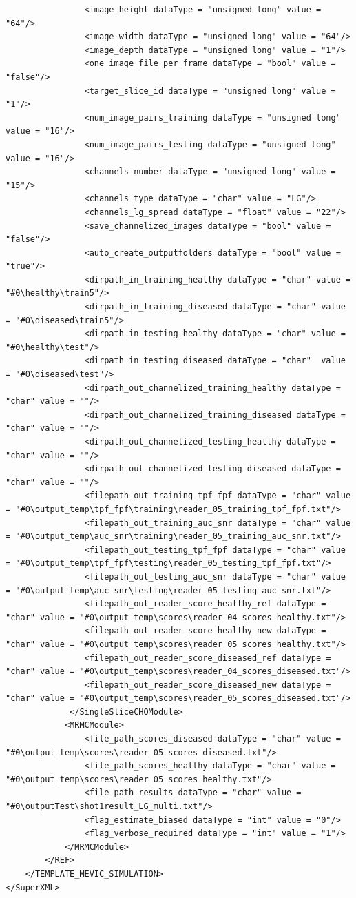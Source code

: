\begin{lstlisting}
				<image_height dataType = "unsigned long" value = "64"/>
				<image_width dataType = "unsigned long" value = "64"/>
				<image_depth dataType = "unsigned long" value = "1"/>
				<one_image_file_per_frame dataType = "bool" value = "false"/>
				<target_slice_id dataType = "unsigned long" value = "1"/>
				<num_image_pairs_training dataType = "unsigned long" value = "16"/>
				<num_image_pairs_testing dataType = "unsigned long" value = "16"/>
				<channels_number dataType = "unsigned long" value = "15"/>	
				<channels_type dataType = "char" value = "LG"/>
				<channels_lg_spread dataType = "float" value = "22"/>
				<save_channelized_images dataType = "bool" value = "false"/>
				<auto_create_outputfolders dataType = "bool" value = "true"/>
				<dirpath_in_training_healthy dataType = "char" value = "#0\healthy\train5"/>
				<dirpath_in_training_diseased dataType = "char" value = "#0\diseased\train5"/>
				<dirpath_in_testing_healthy dataType = "char" value = "#0\healthy\test"/>
				<dirpath_in_testing_diseased dataType = "char"  value = "#0\diseased\test"/>
				<dirpath_out_channelized_training_healthy dataType = "char" value = ""/>
				<dirpath_out_channelized_training_diseased dataType = "char" value = ""/>
				<dirpath_out_channelized_testing_healthy dataType = "char" value = ""/>
				<dirpath_out_channelized_testing_diseased dataType = "char" value = ""/>
				<filepath_out_training_tpf_fpf dataType = "char" value = "#0\output_temp\tpf_fpf\training\reader_05_training_tpf_fpf.txt"/>
				<filepath_out_training_auc_snr dataType = "char" value = "#0\output_temp\auc_snr\training\reader_05_training_auc_snr.txt"/>
				<filepath_out_testing_tpf_fpf dataType = "char" value = "#0\output_temp\tpf_fpf\testing\reader_05_testing_tpf_fpf.txt"/>
				<filepath_out_testing_auc_snr dataType = "char" value = "#0\output_temp\auc_snr\testing\reader_05_testing_auc_snr.txt"/>
				<filepath_out_reader_score_healthy_ref dataType = "char" value = "#0\output_temp\scores\reader_04_scores_healthy.txt"/>
				<filepath_out_reader_score_healthy_new dataType = "char" value = "#0\output_temp\scores\reader_05_scores_healthy.txt"/>
				<filepath_out_reader_score_diseased_ref dataType = "char" value = "#0\output_temp\scores\reader_04_scores_diseased.txt"/>
				<filepath_out_reader_score_diseased_new dataType = "char" value = "#0\output_temp\scores\reader_05_scores_diseased.txt"/>
			 </SingleSliceCHOModule>
			<MRMCModule>
				<file_path_scores_diseased dataType = "char" value = "#0\output_temp\scores\reader_05_scores_diseased.txt"/>
				<file_path_scores_healthy dataType = "char" value = "#0\output_temp\scores\reader_05_scores_healthy.txt"/>
				<file_path_results dataType = "char" value = "#0\outputTest\shot1result_LG_multi.txt"/>
				<flag_estimate_biased dataType = "int" value = "0"/>
				<flag_verbose_required dataType = "int" value = "1"/>
			</MRMCModule>
		</REF>	
	</TEMPLATE_MEVIC_SIMULATION>
</SuperXML>
\end{lstlisting}

